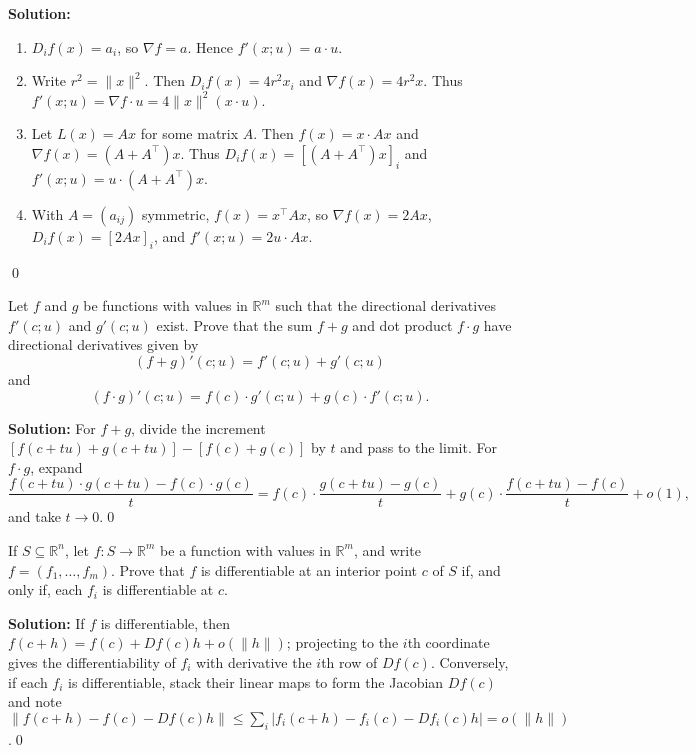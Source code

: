 \noindent\textbf{Solution:}
\begin{enumerate}[label=(\alph*)]
\item $D_i f(x)=a_i$, so $\nabla f=a$. Hence $f'(x;u)=a\cdot u$.
\item Write $r^2=\|x\|^2$. Then $D_i f(x)=4r^2 x_i$ and $\nabla f(x)=4r^2 x$. Thus $f'(x;u)=\nabla f\cdot u=4\|x\|^2(x\cdot u)$.
\item Let $L(x)=Ax$ for some matrix $A$. Then $f(x)=x\cdot Ax$ and $\nabla f(x)=(A+A^{\!\top})x$. Thus $D_i f(x)=[(A+A^{\!\top})x]_i$ and $f'(x;u)=u\cdot (A+A^{\!\top})x$.
\item With $A=(a_{ij})$ symmetric, $f(x)=x^{\!\top}Ax$, so $\nabla f(x)=2Ax$, $D_i f(x)=[2Ax]_i$, and $f'(x;u)=2u\cdot Ax$.
\end{enumerate}\qed


\begin{problembox}
Let \( f \) and \( g \) be functions with values in \( \mathbb{R}^m \) such that the directional derivatives \( f'(c; u) \) and \( g'(c; u) \) exist. Prove that the sum \( f + g \) and dot product \( f \cdot g \) have directional derivatives given by
\[(f + g)'(c; u) = f'(c; u) + g'(c; u)\]
and
\[(f \cdot g)'(c; u) = f(c) \cdot g'(c; u) + g(c) \cdot f'(c; u).\]
\end{problembox}

\noindent\textbf{Solution:}
For $f+g$, divide the increment $[f(c+tu)+g(c+tu)]-[f(c)+g(c)]$ by $t$ and pass to the limit. For $f\cdot g$, expand
\[\frac{f(c+tu)\cdot g(c+tu)-f(c)\cdot g(c)}{t}=f(c)\cdot\frac{g(c+tu)-g(c)}{t}+g(c)\cdot\frac{f(c+tu)-f(c)}{t}+o(1),\]
and take $t\to0$.\qed


\begin{problembox}
If \( S \subseteq \mathbb{R}^n \), let \( f: S \to \mathbb{R}^m \) be a function with values in \( \mathbb{R}^m \), and write \( f = (f_1, \ldots, f_m) \). Prove that \( f \) is differentiable at an interior point \( c \) of \( S \) if, and only if, each \( f_i \) is differentiable at \( c \).
\end{problembox}

\noindent\textbf{Solution:}
If $f$ is differentiable, then $f(c+h)=f(c)+Df(c)h+o(\|h\|)$; projecting to the $i$th coordinate gives the differentiability of $f_i$ with derivative the $i$th row of $Df(c)$. Conversely, if each $f_i$ is differentiable, stack their linear maps to form the Jacobian $Df(c)$ and note $\|f(c+h)-f(c)-Df(c)h\|\le\sum_i |f_i(c+h)-f_i(c)-Df_i(c)h|=o(\|h\|)$.\qed


